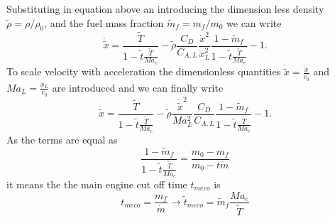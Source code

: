 Substituting in equation above an introducing the dimension less density $\tilde{\rho} = \rho/\rho_0$, and the fuel mass fraction $\tilde{m}_f = m_f / m_0$ we can write
\begin{equation}
	\ddot{\tilde{x}} = \frac{\tilde{T}}{1 - \tilde{t} \frac{\tilde{T}}{Ma_e}} - \tilde{\rho} \frac{C_D}{C_{A, L}} \frac{\dot{x}^2}{\dot{x}_L^2} \frac{1 - \tilde{m}_f}{1 - \tilde{t} \frac{\tilde{T}}{Ma_e}} - 1.
\end{equation}
To scale velocity with acceleration the dimensionless quantities $\dot{\tilde{x}} = \frac{\dot{x}}{c_0}$ and $Ma_L = \frac{\dot{x}_L}{c_0}$ are introduced and we can finally write
\begin{equation}
	\ddot{\tilde{x}} = \frac{\tilde{T}}{1 - \tilde{t} \frac{\tilde{T}}{Ma_e}} - \tilde{\rho} \frac{\dot{\tilde{x}}^2}{Ma_L^2} \frac{C_D}{C_{A, L}} \frac{1 - \tilde{m}_f}{1 - \tilde{t} \frac{\tilde{T}}{Ma_e}} - 1.
\end{equation}
As the terms are equal as
\begin{equation}
	\frac{1 - \tilde{m}_f}{1 - \tilde{t} \frac{\tilde{T}}{Ma_e}} = \frac{m_0 - m_f}{m_0 - t \dot{m}}
\end{equation}
it means the the main engine cut off time $t_{meco}$ is
\begin{equation}
t_{meco} = \frac{m_f}{\dot{m}} \rightarrow \tilde{t}_{meco} = \tilde{m}_f\frac{Ma_e}{\tilde{T}}
\end{equation}